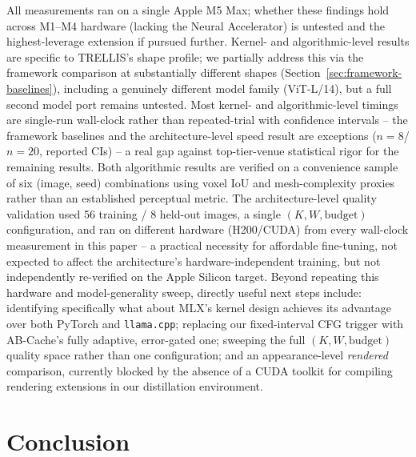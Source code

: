 \documentclass{article}
\newcommand{\code}[1]{\texttt{#1}}
\begin{document}
All measurements ran on a single Apple M5 Max; whether these findings hold across M1--M4 hardware
(lacking the Neural Accelerator) is untested and the highest-leverage extension if pursued further.
Kernel- and algorithmic-level results are specific to TRELLIS's shape profile; we partially address
this via the framework comparison at substantially different shapes
(Section~\ref{sec:framework-baselines}), including a genuinely different model family
(ViT-L/14), but a full second model port remains untested. Most
kernel- and algorithmic-level timings are single-run wall-clock rather than repeated-trial with
confidence intervals -- the framework baselines and the architecture-level speed result are
exceptions ($n{=}8$/$n{=}20$, reported CIs) -- a real gap against top-tier-venue statistical rigor
for the remaining results. Both algorithmic results are verified on a convenience sample of six
(image, seed) combinations using voxel IoU and mesh-complexity proxies rather than an established
perceptual metric. The architecture-level quality validation used 56 training / 8 held-out images,
a single $(K, W, \text{budget})$ configuration, and ran on different hardware (H200/CUDA) from
every wall-clock measurement in this paper -- a practical necessity for affordable fine-tuning,
not expected to affect the architecture's hardware-independent training, but not independently
re-verified on the Apple Silicon target. Beyond repeating this hardware and model-generality sweep,
directly useful next steps include: identifying specifically what about MLX's kernel design
achieves its advantage over both PyTorch and \code{llama.cpp}; replacing our fixed-interval CFG
trigger with AB-Cache's fully adaptive, error-gated one; sweeping the full $(K,W,\text{budget})$
quality space rather than one configuration; and an appearance-level \emph{rendered} comparison,
currently blocked by the absence of a CUDA toolkit for compiling rendering extensions in our
distillation environment.

\section{Conclusion}
\end{document}
